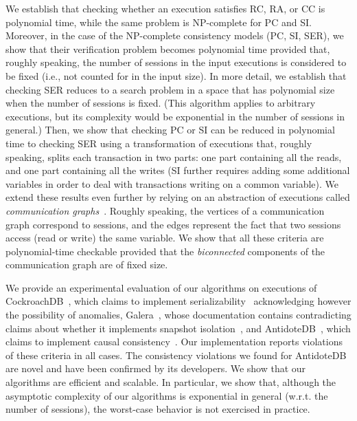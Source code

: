 We establish that checking whether an execution satisfies RC, RA, or CC is polynomial time, while the same problem is NP-complete for PC and SI. Moreover, in the case of the NP-complete consistency models (PC, SI, SER), we show that their verification problem becomes polynomial time provided that, roughly speaking, the number of sessions in the input executions is considered to be fixed (i.e., not counted for in the input size). In more detail, we establish that checking SER reduces to a search problem in a space that has polynomial size when the number of sessions is fixed. (This algorithm applies to arbitrary executions, but its complexity would be exponential in the number of sessions in general.) Then, we show that checking PC or SI can be reduced in polynomial time to checking SER using a transformation of executions that, roughly speaking, splits each transaction in two parts: one part containing all the reads, and one part containing all the writes (SI further requires adding some additional variables in order to deal with transactions writing on a common variable).
We extend these results even further by relying on an abstraction of executions called \emph{communication graphs}~\cite{DBLP:journals/pacmpl/ChalupaCPSV18}. Roughly speaking, the vertices of a communication graph correspond to sessions, and the edges represent the fact that two sessions access (read or write) the same variable. We show that all these criteria are polynomial-time checkable provided that the \emph{biconnected} components of the communication graph are of fixed size.

We provide an experimental evaluation of our algorithms on executions of CockroachDB~\cite{cockroach}, which claims to implement serializability~\cite{cockroach-claim} acknowledging however the possibility of anomalies, Galera~\cite{galera}, whose documentation contains contradicting claims about whether it implements snapshot isolation~\cite{galera-claim,galera-notclaim}, and AntidoteDB~\cite{antidote}, which claims to implement causal consistency~\cite{antidote-claim}.
Our implementation reports violations of these criteria in all cases. 
The consistency violations we found for AntidoteDB are novel and have been confirmed by its developers. We show that our algorithms are efficient and scalable.
In particular, we show that, although the asymptotic complexity of our algorithms is exponential in general (w.r.t. the number of sessions), the worst-case behavior is not exercised in practice.

